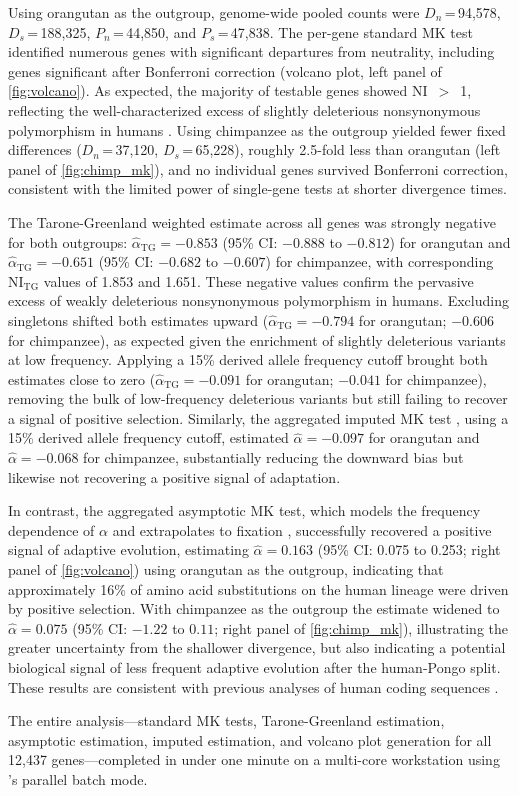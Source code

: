 Using orangutan as the outgroup,
genome-wide pooled counts were
$D_n$\,=\,94,578, $D_s$\,=\,188,325, $P_n$\,=\,44,850,
and $P_s$\,=\,47,838.
The per-gene standard MK test identified numerous genes
with significant departures from neutrality,
including genes significant after Bonferroni correction
(volcano plot, left panel of \cref{fig:volcano}).
As expected,
the majority of testable genes showed NI~$>$~1,
reflecting the well-characterized excess
of slightly deleterious nonsynonymous polymorphism in humans
\citep{li2008}.
Using chimpanzee as the outgroup yielded fewer fixed differences
($D_n$\,=\,37,120, $D_s$\,=\,65,228), roughly 2.5-fold less than
orangutan (left panel of \cref{fig:chimp_mk}),
and no individual genes survived Bonferroni correction,
consistent with the limited power of single-gene tests
at shorter divergence times.

The Tarone-Greenland weighted estimate \citep{stoletzki2011}
across all genes was strongly negative for both outgroups:
$\hat{\alpha}_\text{TG} = -0.853$
(95\% CI: $-0.888$ to $-0.812$)
for orangutan
and $\hat{\alpha}_\text{TG} = -0.651$
(95\% CI: $-0.682$ to $-0.607$)
for chimpanzee,
with corresponding $\text{NI}_\text{TG}$ values of 1.853 and 1.651.
These negative values confirm the pervasive excess
of weakly deleterious nonsynonymous polymorphism in humans.
Excluding singletons shifted both estimates upward
($\hat{\alpha}_\text{TG} = -0.794$ for orangutan;
$-0.606$ for chimpanzee),
as expected given the enrichment of slightly deleterious
variants at low frequency.
Applying a 15\% derived allele frequency cutoff
\citep{fay2001}
brought both estimates close to zero
($\hat{\alpha}_\text{TG} = -0.091$ for orangutan;
$-0.041$ for chimpanzee),
removing the bulk of low-frequency deleterious variants
but still failing to recover a signal of positive selection.
Similarly, the aggregated imputed MK test \citep{murga-moreno2022},
using a 15\% derived allele frequency cutoff,
estimated $\hat{\alpha} = -0.097$ for orangutan
and $\hat{\alpha} = -0.068$ for chimpanzee,
substantially reducing the downward bias
but likewise not recovering a positive signal of adaptation.

In contrast, the aggregated asymptotic MK test,
which models the frequency dependence of $\alpha$
and extrapolates to fixation \citep{messer2013},
successfully recovered a positive signal of adaptive evolution,
estimating $\hat{\alpha} = 0.163$
(95\% CI: 0.075 to 0.253; right panel of \cref{fig:volcano})
using orangutan as the outgroup,
indicating that approximately 16\% of amino acid substitutions
on the human lineage were driven by positive selection.
With chimpanzee as the outgroup the estimate widened to
$\hat{\alpha} = 0.075$ (95\% CI: $-1.22$ to $0.11$;
right panel of \cref{fig:chimp_mk}),
illustrating the greater uncertainty
from the shallower divergence, but also indicating 
a potential biological signal of less frequent adaptive evolution
after the human-Pongo split. 
These results are consistent with previous analyses
of human coding sequences \citep{messer2013}.

The entire analysis---standard MK tests,
Tarone-Greenland estimation, asymptotic estimation,
imputed estimation,
and volcano plot generation for all 12,437 genes---completed
in under one minute on a multi-core workstation
using \mkado's parallel batch mode.
